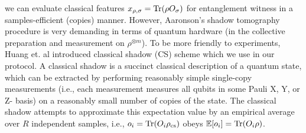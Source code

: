 \documentclass[
aps,
pra,
twocolumn,
floatfix,
]{revtex4-2}
\theoremstyle{plain}
\theoremstyle{definition}
\newtheorem{remark}{Remark}
\newcommand{\ob}{O}
\newcommand{\pob}{O}
\newcommand{\dm}{\rho}
\newcommand{\cs}{\text{cs}}
\begin{document}
we can evaluate classical features $x_{\dm,\sigma}=\Tr(\dm\pob_{\sigma})$ for entanglement witness in a samples-efficient (copies) manner.
However, Aaronson's shadow tomography procedure is very demanding in terms of quantum hardware (in the collective preparation and measurement on $\dm^{\otimes m}$).
To be more friendly to experiments, Huang et. al \cite{huangPredictingManyProperties2020} introduced classical shadow (CS) scheme which we use in our protocol.
A classical shadow is a succinct classical description of a quantum state, which can be extracted by performing reasonably simple single-copy measurements 
(i.e., each measurement measures all qubits in some Pauli X, Y, or Z- basis) 
on a reasonably small number of copies of the state.
The classical shadow attempts to approximate this expectation value by an empirical average over $R$ independent samples, 
i.e., $o_i = \Tr(O_i \dm_{\cs})$ obeys $\expectation[o_i] =\Tr(O_i \dm)$.
\end{document}
